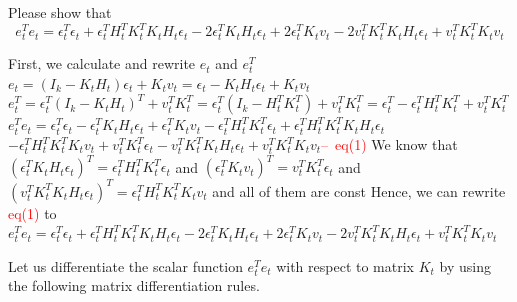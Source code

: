 \documentclass[a4 paper]{article}
\begin{document}
\begin{tcolorbox}[colback=RubineRed!5!white,colframe=RubineRed!75!black]
    Please show that 
    \begin{equation}
        e_t^Te_t=\epsilon_t^T\epsilon_t+\epsilon_t^TH_t^TK_t^TK_tH_t\epsilon_t-2\epsilon_t^TK_tH_t\epsilon_t+2\epsilon_t^TK_tv_t-2v_t^TK_t^TK_tH_t\epsilon_t+v_t^TK_t^TK_tv_t
    \end{equation}
\end{tcolorbox}
\begin{tcolorbox}[colback=YellowGreen!5!white,colframe=YellowGreen!75!black,title={Problem 1's answer}]
    First, we calculate and rewrite $e_t$ and $e_t^T$\newline
    $e_t=(I_k-K_tH_t)\epsilon_t+K_tv_t=\epsilon_t-K_tH_t\epsilon_t+K_tv_t$ \newline
    $e_t^T=\epsilon_t^T(I_k-K_tH_t)^T+v_t^TK_t^T=\epsilon_t^T(I_k-H_t^TK_t^T)+v_t^TK_t^T=\epsilon_t^T-\epsilon_t^TH_t^TK_t^T+v_t^TK_t^T$\newline
    \newline
    $e_t^Te_t=\epsilon_t^T\epsilon_t-\epsilon_t^TK_tH_t\epsilon_t+\epsilon_t^TK_tv_t-\epsilon_t^TH_t^TK_t^T\epsilon_t+\epsilon_t^TH_t^TK_t^TK_tH_t\epsilon_t$\newline
    \hspace*{0.5cm}$-\epsilon_t^TH_t^TK_t^TK_tv_t+v_t^TK_t^T\epsilon_t-v_t^TK_t^TK_tH_t\epsilon_t+v_t^TK_t^TK_tv_t$\hspace*{0.2cm}\textcolor{red}{--\ eq(1)}\newline
    \newline
    We know that $\left(\epsilon_t^TK_tH_t\epsilon_t\right)^T=\epsilon_t^TH_t^TK_t^T\epsilon_t$ and $\left(\epsilon_t^TK_tv_t\right)^T=v_t^TK_t^T\epsilon_t$\newline
    \hspace*{0.5cm}and $\left(v_t^TK_t^TK_tH_t\epsilon_t\right)^T=\epsilon_t^TH_t^TK_t^TK_tv_t$ and all of them are const\newline
    \newline
    Hence, we can rewrite \textcolor{red}{eq(1)} to \newline
    $e_t^Te_t=\epsilon_t^T\epsilon_t+\epsilon_t^TH_t^TK_t^TK_tH_t\epsilon_t-2\epsilon_t^TK_tH_t\epsilon_t+2\epsilon_t^TK_tv_t-2v_t^TK_t^TK_tH_t\epsilon_t+v_t^TK_t^TK_tv_t$
\end{tcolorbox}
\clearpage %
Let us differentiate the scalar function $e_t^Te_t$ with respect to matrix $K_t$ by using the following matrix differentiation rules.
\end{document}

